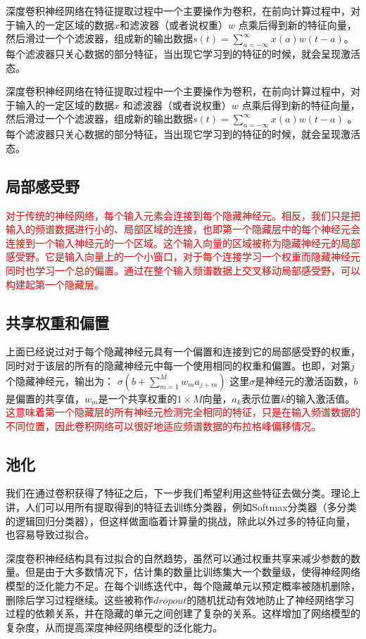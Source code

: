 深度卷积神经网络在特征提取过程中一个主要操作为卷积，在前向计算过程中，对于输入的一定区域的数据$x$和滤波器（或者说权重）$w$ 点乘后得到新的特征向量，然后滑过一个个滤波器，组成新的输出数据$s(t)=\sum_{a=-\infty}^{\infty}x(a)w(t-a) $。每个滤波器只关心数据的部分特征，当出现它学习到的特征的时候，就会呈现激活态。

深度卷积神经网络在特征提取过程中一个主要操作为卷积，在前向计算过程中，对于输入的一定区域的数据$x$ 和滤波器（或者说权重）$w$ 点乘后得到新的特征向量，然后滑过一个个滤波器，组成新的输出数据$s(t)=\sum_{a=-\infty}^{\infty}x(a)w(t-a)$ 。每个滤波器只关心数据的部分特征，当出现它学习到的特征的时候，就会呈现激活态。

\subsection{局部感受野}
\textcolor{red}{对于传统的神经网络，每个输入元素会连接到每个隐藏神经元。相反，我们只是把输入的频谱数据进行小的、局部区域的连接，也即第一个隐藏层中的每个神经元会连接到一个输入神经元的一个区域。这个输入向量的区域被称为隐藏神经元的局部感受野。它是输入向量上的一个小窗口，对于每个连接学习一个权重而隐藏神经元同时也学习一个总的偏置。通过在整个输入频谱数据上交叉移动局部感受野，可以构建起第一个隐藏层。
}

\subsection{共享权重和偏置}
上面已经说过对于每个隐藏神经元具有一个偏置和连接到它的局部感受野的权重，同时对于该层的所有的隐藏神经元中每一个使用相同的权重和偏置。也即，对第$j$个隐藏神经元，输出为：
$\sigma(b+\sum_{m=1}^M w_m a_{j+m}) $
这里$\sigma$是神经元的激活函数，$b$是偏置的共享值，$w_m$是一个共享权重的$1\times M$向量，$a_k$表示位置$k$的输入激活值。\textcolor{red}{这意味着第一个隐藏层的所有神经元检测完全相同的特征，只是在输入频谱数据的不同位置，因此卷积网络可以很好地适应频谱数据的布拉格峰偏移情况。}

\subsection{池化}
我们在通过卷积获得了特征之后，下一步我们希望利用这些特征去做分类。理论上讲，人们可以用所有提取得到的特征去训练分类器，例如Softmax分类器（多分类的逻辑回归分类器），但这样做面临着计算量的挑战，除此以外过多的特征向量，也容易导致过拟合。

深度卷积神经结构具有过拟合的自然趋势，虽然可以通过权重共享来减少参数的数量。但是由于大多数情况下，估计集的数量比训练集大一个数量级，使得神经网络模型的泛化能力不足。在每个训练迭代中，每个隐藏单元以预定概率被随机删除，删除后学习过程继续。这些被称作$dropout$的随机扰动有效地防止了神经网络学习过程的依赖关系，并在隐藏的单元之间创建了复杂的关系。这样增加了网络模型的复杂度，从而提高深度神经网络模型的泛化能力。
